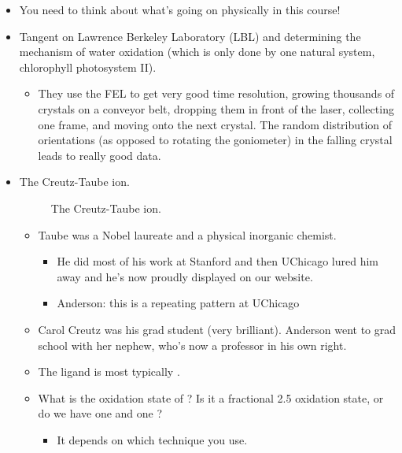 \documentclass[../notes.tex]{subfiles}
\begin{document}
\begin{itemize}
\begin{itemize}
        \item Units are \si{\milli\meter\per\second}.
    \end{itemize}
    \item You need to think about what's going on physically in this course!
    \item Tangent on Lawrence Berkeley Laboratory (LBL) and determining the mechanism of water oxidation (which is only done by one natural system, chlorophyll photosystem II).
    \begin{itemize}
        \item They use the FEL to get very good time resolution, growing thousands of crystals on a conveyor belt, dropping them in front of the laser, collecting one frame, and moving onto the next crystal. The random distribution of orientations (as opposed to rotating the goniometer) in the falling crystal leads to really good data.
    \end{itemize}
    \item The Creutz-Taube ion.
    \begin{figure}[H]
        \centering
        \footnotesize
        \chemleft{[}
        \chemright{]^{5+}}
        \caption{The Creutz-Taube ion.}
        \label{fig:CreutzTaube}
    \end{figure}
    \begin{itemize}
        \item Taube was a Nobel laureate and a physical inorganic chemist.
        \begin{itemize}
            \item He did most of his work at Stanford and then UChicago lured him away and he's now proudly displayed on our website.
            \item Anderson: this is a repeating pattern at UChicago
        \end{itemize}
        \item Carol Creutz was his grad student (very brilliant). Anderson went to grad school with her nephew, who's now a professor in his own right.
        \item The ligand is most typically .
        \item What is the oxidation state of ? Is it a fractional 2.5 oxidation state, or do we have one  and one ?
        \begin{itemize}
            \item It depends on which technique you use.

\end{itemize}
\end{itemize}
\end{itemize}
\end{document}
